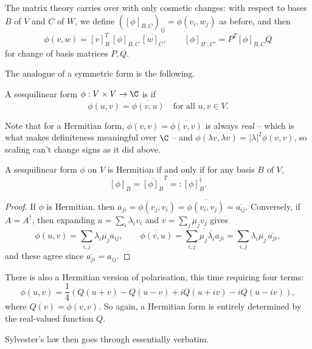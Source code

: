 The matrix theory carries over with only cosmetic changes: with respect to bases $B$ of $V$ and $C$ of $W$, we define $([\phi]_{B, C})_{ij} = \phi(v_i, w_j)$ as before, and then
$$
\phi(v, w) = [v]_B^T \, [\phi]_{B,C}\, \overline{[w]_C}, \qquad [\phi]_{B', C'} = P^T [\phi]_{B, C} \overline{Q}
$$
for change of basis matrices $P, Q$.

The analogue of a symmetric form is the following.

\begin{definition}
    A sesquilinear form $\phi: V \times V \rightarrow \C$ is  if
    $$
    \phi(u, v) = \overline{\phi(v, u)} \quad \text{for all } u, v \in V.
    $$
\end{definition}

Note that for a Hermitian form, $\phi(v, v) = \overline{\phi(v,v)}$ is always \emph{real} -- which is what makes definiteness meaningful over $\C$ -- and $\phi(\lambda v, \lambda v) = |\lambda|^2 \phi(v,v)$, so scaling can't change signs as it did above.

\begin{lemma}
    A sesquilinear form $\phi$ on $V$ is Hermitian if and only if for any basis $B$ of $V$,
    $$
    [\phi]_B = \overline{[\phi]_B}^T =: [\phi]_B^\dagger.
    $$
\end{lemma}
\begin{proof}
    If $\phi$ is Hermitian, then $a_{ji} = \phi(v_j, v_i) = \overline{\phi(v_i, v_j)} = \overline{a_{ij}}$. Conversely, if $A = A^\dagger$, then expanding $u = \sum_i \lambda_i v_i$ and $v = \sum_j \mu_j v_j$ gives
    $$
    \phi(u, v) = \sum_{i, j}\lambda_i \overline{\mu_j} a_{ij}, \qquad \overline{\phi(v, u)} = \overline{\sum_{i,j} \mu_j \overline{\lambda_i} a_{ji}} = \sum_{i,j} \lambda_i \overline{\mu_j}\, \overline{a_{ji}},
    $$
    and these agree since $\overline{a_{ji}} = a_{ij}$.
\end{proof}

There is also a Hermitian version of polarisation, this time requiring four terms:
$$
\phi(u, v) = \frac{1}{4}\left(Q(u + v) - Q(u - v) + iQ(u + iv) - iQ(u - iv)\right),
$$
where $Q(v) = \phi(v,v)$. So again, a Hermitian form is entirely determined by the real-valued function $Q$.

Sylvester's law then goes through essentially verbatim.

